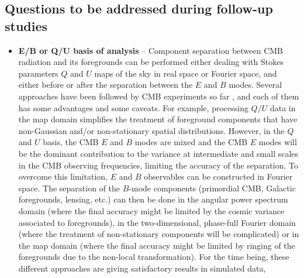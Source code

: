 \subsection{Questions to be addressed during follow-up studies}
\begin{itemize}
	\item \textbf{E/B or Q/U basis of analysis} -- Component separation between CMB radiation and its foregrounds can be performed either dealing with Stokes parameters $Q$ and $U$ maps of the sky in real space or Fourier space, and either before or after the separation between the $E$ and $B$ modes. Several approaches have been followed by CMB experiments so far \cite{gold11,planck15-11, bicepkeckplanck15},
and each of them has some advantages and some caveats. For example, processing $Q/U$ data in the map domain 
simplifies the treatment of foreground components that have non-Gaussian and/or non-stationary
spatial distributions.
However, in the $Q$ and $U$ basis, the CMB $E$ and $B$ modes are mixed and the CMB $E$ modes will be the dominant contribution to the variance at intermediate and small scales in the CMB observing frequencies, limiting the accuracy of the separation.
To overcome this limitation, $E$ and $B$ observables can be constructed in Fourier space. 
The separation of the $B$-mode components (primordial CMB, Galactic foregrounds, lensing, etc.) can then be done in the angular power spectrum domain (where the final accuracy might be limited by the cosmic variance associated to foregrounds),
in the two-dimensional, phase-full Fourier domain (where the treatment of non-stationary components
will be complicated)
or in the map domain (where the final accuracy might be limited by ringing of the foregrounds due to the non-local transformation). For the time being, these different approaches are giving satisfactory results in simulated data,  

\end{itemize}
